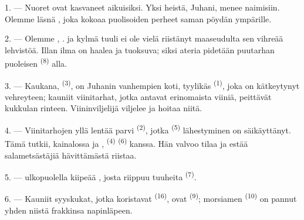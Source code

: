 
\VUsaut{4.0mm}
\VUsaut{1.6mm}
\VUsaut{3.2mm}

\VUsaut{1.6mm}
\VUsaut{2.6mm}

\VUsaut{3.0mm}

1. --- Nuoret ovat kasvaneet aikuisiksi. Yksi heistä, Juhani, menee naimisiin.
Olemme läsnä , joka kokoaa puolisoiden perheet saman pöydän
ympärille.

2. --- Olemme , .  ja
 kylmä tuuli ei ole vielä riistänyt maaseudulta sen vihreää
lehvistöä. Illan ilma on haalea ja tuoksuva; siksi ateria pidetään puutarhan
puoleisen  \textsuperscript{(8)} alla.

3. --- Kaukana,  \textsuperscript{(3)}, on Juhanin vanhempien
koti, tyylikäs  \textsuperscript{(1)}, joka on kätkeytynyt
vehreyteen; kauniit viinitarhat, jotka antavat erinomaista viiniä, peittävät
kukkulan rinteen. Viininviljelijä viljelee ja hoitaa niitä.

4. --- Viinitarhojen yllä lentää parvi  \textsuperscript{(2)},
jotka  \textsuperscript{(5)} lähestyminen on
säikäyttänyt. Tämä tutkii,  kainalossa ja
,  \textsuperscript{(4)}
 \textsuperscript{(6)} kanssa. Hän valvoo tilaa ja estää
salametsästäjiä hävittämästä riistaa.

5. ---  ulkopuolella kiipeää ,
josta riippuu tuuheita  \textsuperscript{(7)}.

6. --- Kauniit syyskukat, jotka koristavat 
\textsuperscript{(16)}, ovat  \textsuperscript{(9)};
morsiamen  \textsuperscript{(10)} on pannut yhden niistä frakkinsa
napinläpeen.


